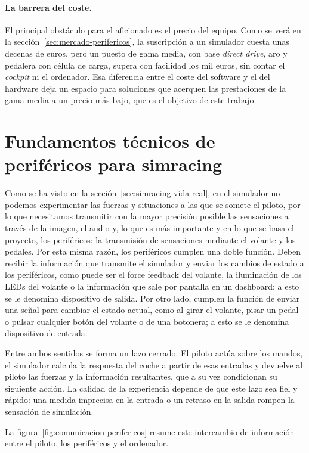\paragraph{La barrera del coste.}
El principal obstáculo para el aficionado es el precio del equipo. Como se verá en la sección~\ref{sec:mercado-perifericos}, la suscripción a un simulador cuesta unas decenas de euros, pero un puesto de gama media, con base \textit{direct drive}, aro y pedalera con célula de carga, supera con
facilidad los mil euros, sin contar el \textit{cockpit} ni el ordenador. Esa diferencia entre el coste del software y el del hardware deja un espacio para soluciones que acerquen las prestaciones de la gama media a un precio más bajo, que es el objetivo de este trabajo.


\section{Fundamentos técnicos de periféricos para simracing}
\label{sec:fundamentos-tecnicos}
Como se ha visto en la sección~\ref{sec:simracing-vida-real}, en el simulador no podemos experimentar las fuerzas y situaciones a las que se somete el piloto, por lo que necesitamos transmitir con la mayor precisión posible las sensaciones a través de la imagen, el audio y, lo que es más importante y en lo que se basa el proyecto, los periféricos: la transmisión de sensaciones mediante el volante y los pedales. Por esta misma razón, los periféricos cumplen una doble función. Deben recibir la información que transmite el simulador y enviar los cambios de estado a los periféricos, como puede ser el force feedback del volante, la iluminación de los LEDs del volante o la información que sale por pantalla en un dashboard; a esto se le denomina dispositivo de salida. Por otro lado, cumplen la función de enviar una señal para cambiar el estado actual, como al girar el volante, pisar un pedal o pulsar cualquier botón del volante o de una botonera; a esto se le denomina dispositivo de entrada.

Entre ambos sentidos se forma un lazo cerrado. El piloto actúa sobre los mandos, el simulador calcula la respuesta del coche a partir de esas entradas y devuelve al piloto las fuerzas y la información resultantes, que a su vez condicionan su siguiente acción. La calidad de la experiencia depende de que este lazo sea fiel y rápido: una medida imprecisa en la entrada o un retraso en la salida rompen la sensación de simulación.

La figura~\ref{fig:comunicacion-perifericos} resume este intercambio de información entre el piloto, los periféricos y el ordenador.

